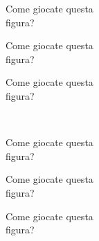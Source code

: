 \documentclass[../corsofiori.tex]{subfiles}
\begin{document}
\bigskip


\begin{minipage}[h][3cm][t]{.3\linewidth}

    Come giocate questa\\ figura?
\end{minipage}
\hfill
\begin{minipage}[h][3cm][t]{.3\linewidth}

    Come giocate questa\\ figura?
\end{minipage}
\hfill
\begin{minipage}[h][3cm][t]{.3\linewidth}

    Come giocate questa\\ figura?
\end{minipage}
\hfill
\bigskip
\\
\begin{minipage}[h][3cm][t]{.3\linewidth}

    Come giocate questa\\ figura?
\end{minipage}
\hfill
\begin{minipage}[h][3cm][t]{.3\linewidth}

    Come giocate questa\\figura?
\end{minipage}
\hfill
\begin{minipage}[h][3cm][t]{.3\linewidth}

    Come giocate questa\\figura?
\end{minipage}
\hfill
\end{document}
